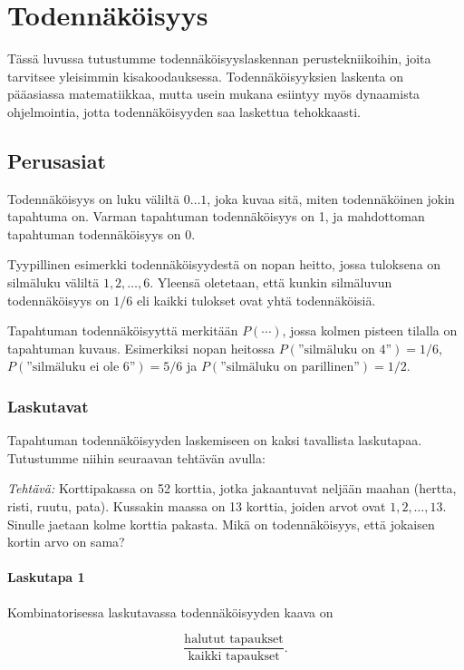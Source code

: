 \chapter{Todennäköisyys}

Tässä luvussa tutustumme todennäköisyyslaskennan
perustekniikoihin, joita tarvitsee yleisimmin
kisakoodauksessa.
Todennäköisyyksien laskenta on pääasiassa
matematiikkaa, mutta usein mukana esiintyy
myös dynaamista ohjelmointia,
jotta todennäköisyyden saa laskettua tehokkaasti.

\section{Perusasiat}

Todennäköisyys on luku väliltä $0 \ldots 1$,
joka kuvaa sitä, miten todennäköinen jokin
tapahtuma on.
Varman tapahtuman todennäköisyys on 1,
ja mahdottoman tapahtuman todennäköisyys on 0.

Tyypillinen esimerkki todennäköisyydestä
on nopan heitto, jossa tuloksena
on silmäluku väliltä $1,2,\ldots,6$.
Yleensä oletetaan, että kunkin silmäluvun
todennäköisyys on $1/6$
eli kaikki tulokset ovat yhtä todennäköisiä.

Tapahtuman todennäköisyyttä merkitään $P(\cdots)$,
jossa kolmen pisteen tilalla on tapahtuman kuvaus.
Esimerkiksi nopan heitossa
$P(\textrm{''silmäluku on 4''})=1/6$,
$P(\textrm{''silmäluku ei ole 6''})=5/6$
ja $P(\textrm{''silmäluku on parillinen''})=1/2$.

\subsection{Laskutavat}

Tapahtuman todennäköisyyden laskemiseen on
kaksi tavallista laskutapaa. Tutustumme niihin
seuraavan tehtävän avulla:

\textit{Tehtävä:} Korttipakassa on 52 korttia, jotka jakaantuvat
neljään maahan (hertta, risti, ruutu, pata).
Kussakin maassa on 13 korttia, joiden arvot ovat $1,2,\ldots,13$.
Sinulle jaetaan kolme korttia pakasta.
Mikä on todennäköisyys, että jokaisen kortin arvo on sama?

\subsubsection*{Laskutapa 1}

Kombinatorisessa laskutavassa
todennäköisyyden kaava on

\[\frac{\textrm{halutut tapaukset}}{\textrm{kaikki tapaukset}}.\]

